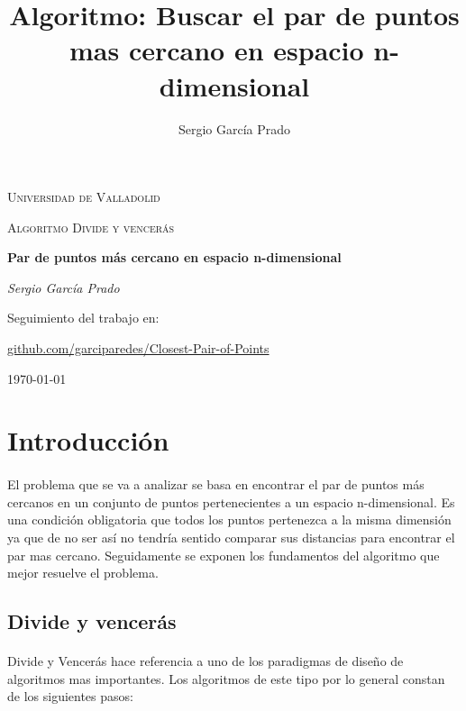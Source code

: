 \documentclass{article}
\title{Algoritmo: Buscar el par de puntos mas cercano en espacio n-dimensional}
\author{Sergio García Prado}
\begin{document}
\begin{titlepage}
	\centering
	{\scshape\LARGE Universidad de Valladolid \par}
	\vspace{1cm}
	{\scshape\Large Algoritmo Divide y vencerás\par}
	\vspace{1.5cm}
	{\huge\bfseries Par de puntos más cercano en espacio n-dimensional\par}
	\vspace{2cm}
	{\Large\itshape Sergio García Prado\par}
	
	\vfill
	Seguimiento del trabajo en: \par
	\href{https://github.com/garciparedes/Closest-Pair-of-Points}{github.com/garciparedes/Closest-Pair-of-Points}

	\vfill


	{\large \today\par}
\end{titlepage}

\section{Introducción}

	\paragraph{}
	El problema que se va a analizar se basa en encontrar el par de puntos más cercanos en un conjunto de puntos pertenecientes a un espacio n-dimensional. Es una condición obligatoria que todos los puntos pertenezca a la misma dimensión ya que de no ser así no tendría sentido comparar sus distancias para encontrar el par mas cercano. Seguidamente se exponen los fundamentos del algoritmo que mejor resuelve el problema.
	
	\subsection{Divide y vencerás}
		
		\paragraph{}
		Divide y Vencerás hace referencia a uno de los paradigmas de diseño de algoritmos mas importantes. Los algoritmos de este tipo por lo general constan de los siguientes pasos:
		
\end{document}
